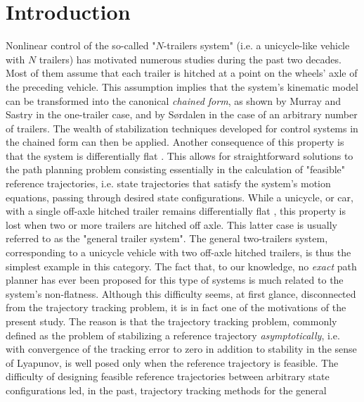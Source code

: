 \documentclass[a4paper,twoside]{article}
\begin{document}
\makeRR   %

  
\tableofcontents 
\newpage

\section{Introduction}

Nonlinear control of the so-called "$N$-trailers system" (i.e. a unicycle-like 
vehicle with $N$ trailers) has motivated numerous studies during the past two decades. Most of them assume that 
each trailer is  hitched at a point on the wheels' axle of the 
preceding vehicle. This assumption implies
that the system's kinematic model can be transformed into the canonical {\em chained form}, as
shown by Murray and Sastry \cite{ms91} in the one-trailer case, and by S{\o}rdalen \cite{so93} in the case of an arbitrary number of trailers. 
The wealth of stabilization techniques developed for control systems in the chained form can then be applied. Another consequence of this property is that 
the system is differentially flat \cite{flmr95}. This allows for straightforward solutions to the path planning problem consisting essentially in the calculation 
of "feasible" reference trajectories, i.e. state trajectories that satisfy the system's motion equations, passing through desired state configurations. While a 
unicycle, or car, with a single off-axle hitched trailer remains
differentially flat \cite{rflm93}, this property is lost when two or more trailers are hitched off
axle. This latter case is usually referred to as the "general trailer system". The general 
two-trailers system, corresponding to a unicycle vehicle with two off-axle hitched trailers, is thus the simplest example in 
this category. The fact that, to our knowledge, no {\em exact} path planner has ever been proposed for this type of systems is much related to the system's 
non-flatness. Although this difficulty seems, at first glance, disconnected from the trajectory 
tracking  problem, it is in fact one of the motivations of the present study. 
The reason is that the trajectory tracking problem, commonly defined as the problem of stabilizing a reference trajectory {\em asymptotically}, i.e. 
with convergence of the tracking error to zero in addition to stability in the sense of Lyapunov, is well posed only when the reference trajectory is feasible. 
The difficulty of designing feasible reference trajectories between arbitrary state configurations led, in the past, trajectory tracking methods for the general 
\end{document}
